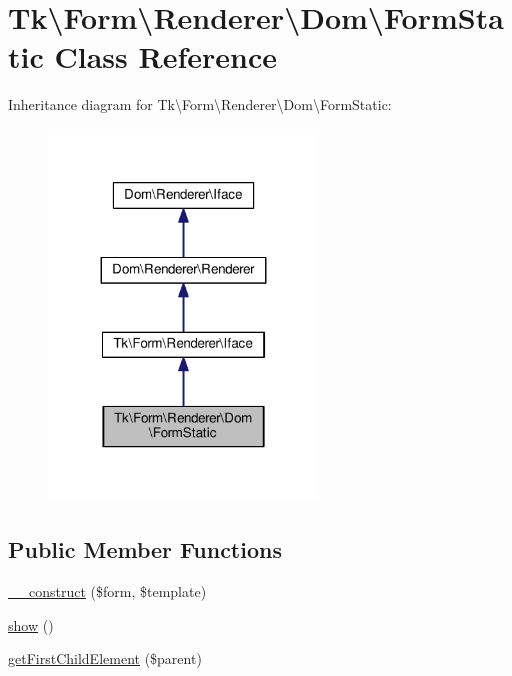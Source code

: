 \hypertarget{classTk_1_1Form_1_1Renderer_1_1Dom_1_1FormStatic}{\section{Tk\textbackslash{}Form\textbackslash{}Renderer\textbackslash{}Dom\textbackslash{}Form\+Static Class Reference}
\label{classTk_1_1Form_1_1Renderer_1_1Dom_1_1FormStatic}
}


Inheritance diagram for Tk\textbackslash{}Form\textbackslash{}Renderer\textbackslash{}Dom\textbackslash{}Form\+Static\+:\nopagebreak
\begin{figure}[H]
\begin{center}
\leavevmode
\includegraphics[width=203pt]{classTk_1_1Form_1_1Renderer_1_1Dom_1_1FormStatic__inherit__graph}
\end{center}
\end{figure}
\subsection*{Public Member Functions}
\begin{DoxyCompactItemize}
\item 
\hyperlink{classTk_1_1Form_1_1Renderer_1_1Dom_1_1FormStatic_ae4722390b401113d1692be54610c4f9f}{\+\_\+\+\_\+construct} (\$form, \$template)
\item 
\hyperlink{classTk_1_1Form_1_1Renderer_1_1Dom_1_1FormStatic_a26fa1ebf33c3504b3f599adf1070e043}{show} ()
\item 
\hyperlink{classTk_1_1Form_1_1Renderer_1_1Dom_1_1FormStatic_a3f0a6ec516a6b750bba6036c2486e3c4}{get\+First\+Child\+Element} (\$parent)
\end{DoxyCompactItemize}
